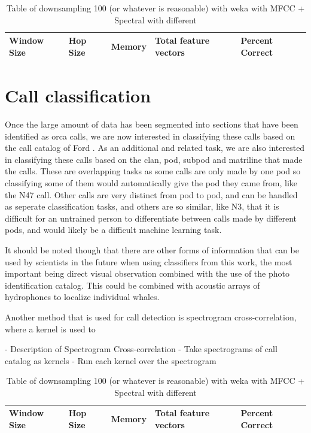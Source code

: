 \documentclass[12pt,oneside]{book}
\begin{document}
\begin{table}
\begin{tabular}{|l|l|l|l|l|}
\hline
Window Size & Hop Size & Memory & Total feature vectors & Percent Correct \\
\hline


\hline
\end{tabular}
\caption{Table of downsampling 100 (or whatever is reasonable) with weka with
MFCC + Spectral with different}
\label{table:mfccSpectralWeka}
\end{table}



\section{Call classification}

Once the large amount of data has been segmented into sections that
have been identified as orca calls, we are now interested in
classifying these calls based on the call catalog of Ford
\cite{ford87}.  As an additional and related task, we are also
interested in classifying these calls based on the clan, pod, subpod
and matriline that made the calls.  These are overlapping tasks as
some calls are only made by one pod so classifying some of them would
automatically give the pod they came from, like the N47 call.  Other
calls are very distinct from pod to pod, and can be handled as
seperate classification tasks, and others are so similar, like N3,
that it is difficult for an untrained person to differentiate between
calls made by different pods, and would likely be a difficult machine
learning task.

It should be noted though that there are other forms of information
that can be used by scientists in the future when using classifiers
from this work, the most important being direct visual observation
combined with the use of the photo identification catalog.  This could
be combined with acoustic arrays of hydrophones to localize individual
whales.



%
%


Another method that is used for call detection is spectrogram
cross-correlation, where a kernel is used to

- Description of Spectrogram Cross-correlation
- Take spectrograms of call catalog as kernels
- Run each kernel over the spectrogram


\begin{table}
\begin{tabular}{|l|l|l|l|l|}
\hline
Window Size & Hop Size & Memory & Total feature vectors & Percent Correct \\
\hline


\hline
\end{tabular}
\caption{Table of downsampling 100 (or whatever is reasonable) with weka with
MFCC + Spectral with different}
\label{table:mfccSpectralWeka}
\end{table}
\end{document}
